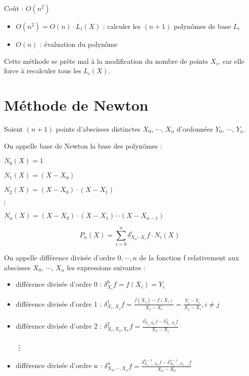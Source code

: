 Coût : $O(n^2)$
\begin{itemize}
\item $O(n^2) = O(n) \cdot L_i(X)$ : calculer les $(n + 1)$ polynômes de base $L_i$
\item $O(n)$ : évaluation du polynôme
\end{itemize}

\bigbreak
Cette méthode se prête mal à la modification du nombre de points $X_i$, car elle force à recalculer tous les $L_i(X)$.


\section {Méthode de Newton}

Soient $(n + 1)$ points d'abscisses distinctes $X_0$, $\cdots$, $X_n$ d'ordonnées $Y_0$, $\cdots$, $Y_n$.

\begin{fdef}
On appelle base de Newton la base des polynômes :

$N_0(X) = 1$

$N_1(X) = (X - X_0)$

$N_2(X) = (X - X_0) \cdot (X - X_1)$

$\vdots$

$N_n(X) = (X - X_0) \cdot (X - X_1) \cdots (X - X_{n - 1})$
\end{fdef}


\begin{equation}
    P_n(X) = \sum_{i = 0}^n \delta_{X_0 \cdots X_i}^i f \cdot N_i(X)
\end{equation}

On appelle différence divisée d'ordre $0, \cdots, n$ de la fonction f relativement aux abscisses $X_0$, $\cdots$, $X_n$ les expressions suivantes :


\begin{itemize}
\item différence divisée d'ordre 0 : $\delta_{X_i}^0 f = f(X_i) = Y_i$
\item différence divisée d'ordre 1 : $\delta_{X_i,X_j}^1 f = \frac{f(X_j) - f(X_i)}{X_j - X_i} = \frac{Y_j - Y_i}{X_j - X_i}, i \ne j$
\item différence divisée d'ordre 2 : $\delta_{X_i,X_j,X_k}^2 f = \frac{\delta_{X_j,X_k}^1 f - \delta_{X_i,X_j}^1 f}{X_k - X_i}$
\\
\\
\vdots
\item différence divisée d'ordre n : $\delta_{X_0,\cdots,X_n}^n f = \frac{\delta_{X_1,\cdots,X_n}^{n - 1} f - \delta_{X_0,\cdots,X_{n - 1}}^{n - 1} f}{X_n - X_0}$
\end{itemize}


